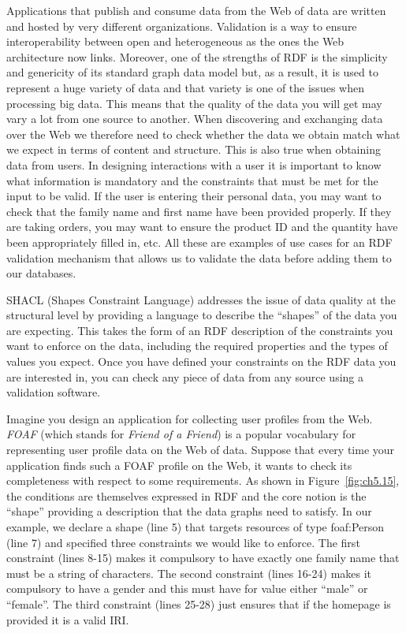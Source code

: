 Applications that publish and consume data from the Web of data are
written and hosted by very different organizations. Validation is a way
to ensure interoperability between open and heterogeneous as the ones
the Web architecture now links. Moreover, one of the strengths of RDF is
the simplicity and genericity of its standard graph data model but, as a
result, it is used to represent a huge variety of data and that variety
is one of the issues when processing big data. This means that the
quality of the data you will get may vary a lot from one source to
another. When discovering and exchanging data over the Web we therefore
need to check whether the data we obtain match what we expect in terms
of content and structure. This is also true when obtaining data from
users. In designing interactions with a user it is important to know
what information is mandatory and the constraints that must be met for
the input to be valid. If the user is entering their personal data, you
may want to check that the family name and first name have been provided
properly. If they are taking orders, you may want to ensure the product
ID and the quantity have been appropriately filled in, etc. All these
are examples of use cases for an RDF validation mechanism that allows us
to validate the data before adding them to our databases.

SHACL (Shapes Constraint Language) addresses the issue of data quality
at the structural level by providing a language to describe the
``shapes'' of the data you are expecting. This takes the form of an RDF
description of the constraints you want to enforce on the data,
including the required properties and the types of values you expect.
Once you have defined your constraints on the RDF data you are
interested in, you can check any piece of data from any source using a
validation software.

Imagine you design an application for collecting user profiles from the
Web. \emph{FOAF} (which stands for \emph{Friend of a Friend}) is a
popular vocabulary for representing user profile data on the Web of
data. Suppose that every time your application finds such a FOAF profile
on the Web, it wants to check its completeness with respect to some
requirements. As shown in Figure~\ref{fig:ch5.15}, the conditions are themselves
expressed in RDF and the core notion is the ``shape'' providing a
description that the data graphs need to satisfy. In our example, we
declare a shape (line 5) that targets resources of type foaf:Person
(line 7) and specified three constraints we would like to enforce. The
first constraint (lines 8-15) makes it compulsory to have exactly one
family name that must be a string of characters. The second constraint
(lines 16-24) makes it compulsory to have a gender and this must have
for value either ``male'' or ``female''. The third constraint (lines
25-28) just ensures that if the homepage is provided it is a valid IRI.

